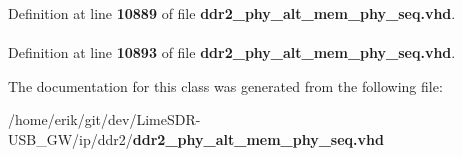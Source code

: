 Definition at line {\bf 10889} of file {\bf ddr2\+\_\+phy\+\_\+alt\+\_\+mem\+\_\+phy\+\_\+seq.\+vhd}.

\paragraph[{work}]{\hspace{0.3cm}{\ttfamily [Library]}}\label{classddr2__phy__alt__mem__phy__dgwb_a9f49de6f5eed5b4488cba6c9cdd1c215}


Definition at line {\bf 10893} of file {\bf ddr2\+\_\+phy\+\_\+alt\+\_\+mem\+\_\+phy\+\_\+seq.\+vhd}.



The documentation for this class was generated from the following file\+:\begin{DoxyCompactItemize}
\item 
/home/erik/git/dev/\+Lime\+S\+D\+R-\/\+U\+S\+B\+\_\+\+G\+W/ip/ddr2/{\bf ddr2\+\_\+phy\+\_\+alt\+\_\+mem\+\_\+phy\+\_\+seq.\+vhd}\end{DoxyCompactItemize}
